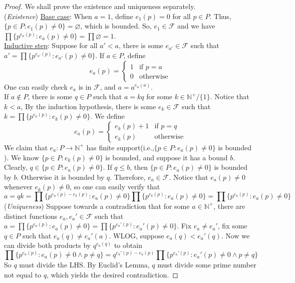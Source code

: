 \documentclass[14pt]{article}
\theoremstyle{definition}
\begin{document}
\begin{proof}
We shall prove the existence and uniqueness separately.\\
(\textit{Existence}) \underline{Base case}: When $a=1$, define $e_1(p)=0$ for all $p\in P$. Thus, $\{p\in P\colon e_1(p)\not=0\}=\varnothing$, which is bounded. So, $e_1\in \mathcal{F}$ and we have $\prod \{p^{e_a(p)}\colon e_a(p)\not=0\}=\prod \varnothing=1 $.\\
\underline{Inductive step}: Suppose for all $a'<a$,  there is some  $e_{a'}\in \mathcal{F}$ such that $a'=\prod \{p^{e_{a'}(p)}\colon e_{a'}(p)\not=0\}$. If $a\in P$, define 
\begin{equation*}
    e_a(p)=
    \begin{cases}
        1 & \text{if } p=a \\
        0 & \text{otherwise}
    \end{cases}
\end{equation*}
One can easily check $e_a$ is in $\mathcal{F}$, and $a=a^{e_a(a)}$.\\
If $a\notin P$, there is some $q\in P$ such that $a=kq$ for some $k\in \mathbb{N}^+/\{1\}$. Notice that $k<a$, By the induction hypothesis, there is some $e_k\in \mathcal{F}$ such that $k=\prod \{p^{e_k(p)}\colon e_k(p)\not=0\}$. We define \begin{equation*}
    e_a (p)=
     \begin{cases}
        e_k(p)+1 & \text{if } p=q \\
        e_k(p) & \text{otherwise}
    \end{cases}
\end{equation*}  
We claim that $e_a\colon P\rightarrow \mathbb{N}^+$ has finite support(i.e.,$\{p\in P\colon e_a(p)\not=0\}$ is bounded ). We know $\{p\in P\colon e_k(p)\not=0\}$ is bounded, and suppose it has a bound $b$. Clearly, $q\in\{p\in P\colon e_a(p)\not=0\}$. If $q\leq b$, then  $\{p\in P\colon e_a(p)\not=0\}$ is bounded by $b$. Otherwise it is bounded by $q$. 
Therefore, $e_a\in \mathcal{F}$.  Notice that $e_a(p)\not=0 $ whenever $e_k(p)\not=0$, so one can easily verify that
\begin{equation*}
    a=qk=\prod \{p^{e_{a}(p)-e_k(p)}\colon e_{a}(p)\not=0\}\prod \{p^{e_{k}(p)}\colon e_{a}(p)\not=0\}=\prod \{p^{e_{a}(p)}\colon e_{a}(p)\not=0\}
\end{equation*}
(\textit{Uniqueness}) Suppose towards a contradiction that for some $a\in \mathbb{N}^+$, there are distinct functions $e_a, e_a' \in \mathcal{F}$ such that $a=\prod \{p^{e_a(p)}\colon e_a(p)\not=0\}=\prod \{p^{e_a'(p)}\colon e_a'(p)\not=0\}$. Fix $e_a\not=e_a'$, fix some $q\in P$ such that $e_a(q)\not= e_a'(a)$. WLOG, suppose $e_a(q)<e_a'(q)$. Now we can divide both products by $q^{e_a(q)}$ to obtain
\begin{equation*}
    \prod \{p^{e_a(p)}\colon e_a(p)\not=0 \wedge p\not= q\}=q^{e_a'(p)-e_a(p)}\prod \{p^{e_a'(p)}\colon e_a'(p)\not=0\wedge p\not= q\}
\end{equation*}
So $q$ must divide the LHS. By Euclid's Lemma, $q$ must divide some prime number not equal to $q$, which yields the desired contradiction.

\end{proof}
\end{document}
